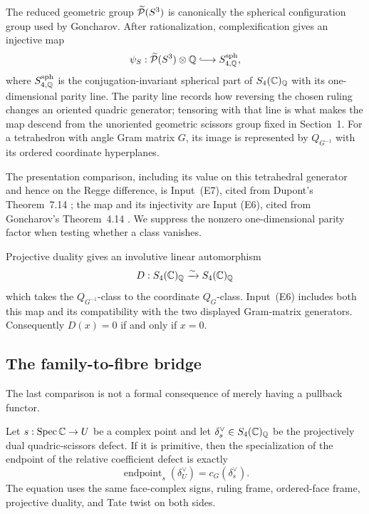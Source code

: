\begin{theorem}
\label{cp:lem-spherical-presentations}
The reduced geometric group \(\widetilde{\mathcal P}(S^3)\) is canonically the spherical
configuration group used by Goncharov.  After rationalization,
complexification gives an injective map
\begin{equation}
 \psi_S:\Pred(S^3)\otimes\Q
 \lhook\joinrel\longrightarrow S_{4,\Q}^{\mathrm{sph}},
 \label{cp:eq-spherical-quadric-map}
\end{equation}
where \(S_{4,\mathbb Q}^{\mathrm{sph}}\) is the conjugation-invariant spherical
part of \(S_4(\mathbb C)_\mathbb Q\) with its one-dimensional parity line.  The parity
line records how reversing the chosen ruling changes an oriented quadric
generator; tensoring with that line is what makes the map descend from the
unoriented geometric scissors group fixed in Section~1.  For a
tetrahedron with angle Gram matrix \(G\), its image is represented by
\(Q_{G^{-1}}\) with its ordered coordinate hyperplanes.
\end{theorem}

The presentation comparison, including its value on this tetrahedral
generator and hence on the Regge difference, is Input~\textup{(E7)}, cited from Dupont's
Theorem~7.14 \cite{Dupont2001}; the map and its injectivity are Input
\textup{(E6)}, cited from Goncharov's Theorem~4.14
\cite{Goncharov1999}.  We suppress the nonzero one-dimensional parity
factor when testing whether a class vanishes.

Projective duality gives an involutive linear automorphism
\[
 D:S_4(\mathbb C)_\mathbb Q\xrightarrow{\sim}S_4(\mathbb C)_\mathbb Q
\]
which takes the \(Q_{G^{-1}}\)-class to the coordinate \(Q_G\)-class.
Input~\textup{(E6)} includes both this map and its compatibility with the
two displayed Gram-matrix generators.  Consequently
\(D(x)=0\) if and only if \(x=0\).

\subsection{The family-to-fibre bridge}

The last comparison is not a formal consequence of merely having a
pullback functor.

\begin{proposition}
\label{cp:lem-fibre-comparison}
Let \(s:\operatorname{Spec}\mathbb C\to U\) be a complex point and let
\(\delta_s^\vee\in S_4(\mathbb C)_\mathbb Q\) be the projectively dual
quadric-scissors defect.  If it is primitive, then the specialization of
the endpoint of the relative coefficient defect is exactly
\begin{equation}
 \operatorname{endpoint}_s(\delta_U^\vee)
 =c_G(\delta_s^\vee).
 \label{cp:eq-fibre-endpoint}
\end{equation}
The equation uses the same face-complex signs, ruling frame, ordered-face
frame, projective duality, and Tate twist on both sides.
\end{proposition}

